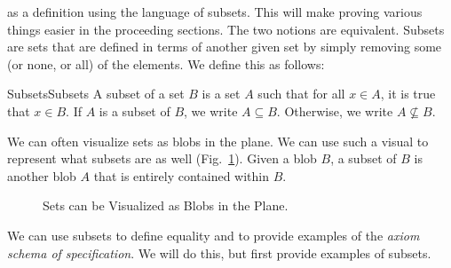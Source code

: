        as a definition using the language of subsets. This will make
        proving various things easier in the proceeding sections. The
        two notions are equivalent.
        Subsets are sets that are defined in terms of another given set
        by simply removing some (or none, or all) of the elements.
        We define this as follows:
        \begin{fdefinition}{Subsets}{Subsets}
            A subset of a set $B$ is a set $A$ such that for all
            $x\in{A}$, it is true that $x\in{B}$. If $A$ is a subset
            of $B$, we write $A\subseteq{B}$. Otherwise, we write
            $A\nsubseteq{B}$.
        \end{fdefinition}
        We can often visualize sets as blobs in the plane. We can use
        such a visual to represent what subsets are as well
        (Fig.~\ref{fig:Subset_Blobs}). Given a blob $B$, a subset of
        $B$ is another blob $A$ that is entirely contained within $B$.
        \begin{figure}[H]
            \centering
            
            \caption[Visual for Subsets]
                    {Sets can be Visualized as Blobs in the Plane.}
            \label{fig:Subset_Blobs}
        \end{figure}
        We can use subsets to define equality and to provide examples
        of the \textit{axiom schema of specification}. We will do this,
        but first provide examples of subsets.
